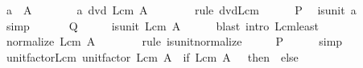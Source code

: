 \begin{isabellebody}
\ {\isachardoublequoteopen}a\ {\isasymin}\ A{\isachardoublequoteclose}\isanewline
\ \ \ \ \isamarkupfalse%
\ \isamarkupfalse%
\ {\isachardoublequoteopen}a\ dvd\ Lcm\ A{\isachardoublequoteclose}\isanewline
\ \ \ \ \ \ \isamarkupfalse%
\ {\isacharparenleft}{\kern0pt}rule\ dvd{\isacharunderscore}{\kern0pt}Lcm{\isacharparenright}{\kern0pt}\isanewline
\ \ \ \ \isamarkupfalse%
\ {\isacartoucheopen}{\isacharquery}{\kern0pt}P{\isacartoucheclose}\ \isamarkupfalse%
\ {\isachardoublequoteopen}is{\isacharunderscore}{\kern0pt}unit\ a{\isachardoublequoteclose}\isanewline
\ \ \ \ \ \ \isamarkupfalse%
\ simp\isanewline
\ \ \isamarkupfalse%
\isanewline
{}\isamarkupfalse%
\isanewline
\ \ \isamarkupfalse%
\ {\isacharquery}{\kern0pt}Q\isanewline
\ \ \isamarkupfalse%
\ \isamarkupfalse%
\ {\isachardoublequoteopen}is{\isacharunderscore}{\kern0pt}unit\ {\isacharparenleft}{\kern0pt}Lcm\ A{\isacharparenright}{\kern0pt}{\isachardoublequoteclose}\isanewline
\ \ \ \ \isamarkupfalse%
\ {\isacharparenleft}{\kern0pt}blast\ intro{\isacharcolon}{\kern0pt}\ Lcm{\isacharunderscore}{\kern0pt}least{\isacharparenright}{\kern0pt}\isanewline
\ \ \isamarkupfalse%
\ \isamarkupfalse%
\ {\isachardoublequoteopen}normalize\ {\isacharparenleft}{\kern0pt}Lcm\ A{\isacharparenright}{\kern0pt}\ {\isacharequal}{\kern0pt}\ {}{\isachardoublequoteclose}\isanewline
\ \ \ \ \isamarkupfalse%
\ {\isacharparenleft}{\kern0pt}rule\ is{\isacharunderscore}{\kern0pt}unit{\isacharunderscore}{\kern0pt}normalize{\isacharparenright}{\kern0pt}\isanewline
\ \ \isamarkupfalse%
\ \isamarkupfalse%
\ {\isacharquery}{\kern0pt}P\isanewline
\ \ \ \ \isamarkupfalse%
\ simp\isanewline
{}\isamarkupfalse%
%
\endisatagproof
{\isafoldproof}%
%
\isadelimproof
\isanewline
%
\endisadelimproof
\isanewline
{}\isamarkupfalse%
\ unit{\isacharunderscore}{\kern0pt}factor{\isacharunderscore}{\kern0pt}Lcm{\isacharcolon}{\kern0pt}\ {\isachardoublequoteopen}unit{\isacharunderscore}{\kern0pt}factor\ {\isacharparenleft}{\kern0pt}Lcm\ A{\isacharparenright}{\kern0pt}\ {\isacharequal}{\kern0pt}\ {\isacharparenleft}{\kern0pt}if\ Lcm\ A\ {\isacharequal}{\kern0pt}\ {}\ then\ {}\ else\ {}{\isacharparenright}{\kern0pt}{\isachardoublequoteclose}\isanewline
%
\isadelimproof
%
\endisadelimproof
%

\end{isabellebody}
